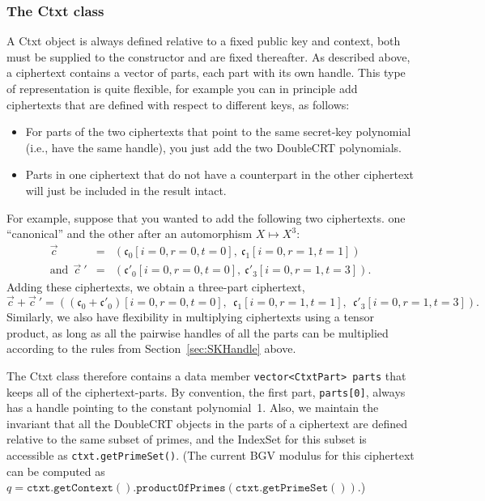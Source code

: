 \documentclass[14pt]{extarticle}
\newcommand{\secref}[1]{Section~\protect\ref{sec:#1}}
\def\IndexSet{\textsf{IndexSet}}
\def\DoubleCRT{\textsf{DoubleCRT}}
\def\Ctxt{\textsf{Ctxt}}
\def\vc{\vec{c}}
\newcommand{\ct}{\mathfrak{c}}
\begin{document}
\subsubsection{The {\Ctxt} class}
A {\Ctxt} object is always defined relative to a fixed public key and
context, both must be supplied to the constructor and are fixed
thereafter. As described above, a ciphertext contains a vector of
parts, each part with its own handle. This type of representation is
quite flexible, for example you can  in principle add ciphertexts
that are defined with respect to different keys, as follows:
\begin{itemize}
\item
For parts of the two ciphertexts that point to the same secret-key
polynomial (i.e., have the same handle), you just add the two
{\DoubleCRT} polynomials.
\item 
Parts in one ciphertext that do not have a counterpart in the other
ciphertext will just be included in the result intact.
\end{itemize}
For example, suppose that you wanted to add the following two
ciphertexts. one ``canonical'' and the other after an automorphism
$X\mapsto X^3$:
\begin{eqnarray*}
\vc\ &=& (\ct_0[i=0,r=0,t=0],~ \ct_1[i=0,r=1,t=1])\\
\mbox{and}~~\vc\ ' &=& (\ct'_0[i=0,r=0,t=0],~ \ct'_3[i=0,r=1,t=3]).
\end{eqnarray*}
Adding these ciphertexts, we obtain a three-part ciphertext,
\[
\vc+\vc\ ' = ((\ct_0+\ct'_0)[i=0,r=0,t=0],~~
            \ct_1[i=0,r=1,t=1],~~ \ct'_3[i=0,r=1,t=3]).
\]
Similarly, we also have flexibility in multiplying ciphertexts using
a tensor product, as long as all the pairwise handles of all the parts
can be multiplied according to the rules from \secref{SKHandle} above.

The {\Ctxt} class therefore contains a data member
\texttt{vector<CtxtPart> parts} that keeps all of the
ciphertext-parts. By convention, the first
part, \texttt{parts[0]}, always has a handle pointing to the constant
polynomial~1. Also, we maintain the invariant that all the
{\DoubleCRT} objects in the parts of a ciphertext are defined
relative to the same subset of primes, and the {\IndexSet} for this
subset is accessible as \texttt{ctxt.getPrimeSet()}. (The current
BGV modulus for this ciphertext can be computed as $q=\mathtt{
ctxt.getContext().productOfPrimes(ctxt.getPrimeSet())}$.)
\end{document}
